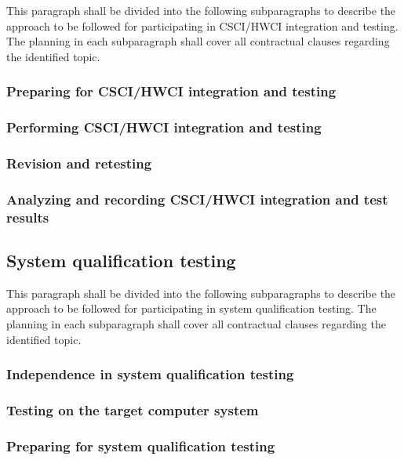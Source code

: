 \documentclass{fidata-report-template}
\begin{document}
This paragraph shall be divided into the following subparagraphs to
describe the approach to be followed for participating in CSCI/HWCI
integration and testing. The planning in each subparagraph shall cover
all contractual clauses regarding the identified topic.

\subsubsection{Preparing for CSCI/HWCI integration and testing}

\subsubsection{Performing CSCI/HWCI integration and testing}

\subsubsection{Revision and retesting}

\subsubsection{Analyzing and recording CSCI/HWCI integration and test
results}

\subsection{System qualification testing}

This paragraph shall be divided into the following subparagraphs to
describe the approach to be followed for participating in system
qualification testing. The planning in each subparagraph shall cover all
contractual clauses regarding the identified topic.

\subsubsection{Independence in system qualification testing}

\subsubsection{Testing on the target computer system}

\subsubsection{Preparing for system qualification testing}
\end{document}
